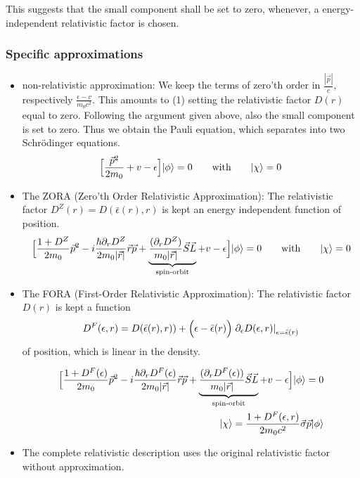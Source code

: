 \documentclass[11pt,a4paper]{report}
\begin{document}
This suggests that the small component shall be set to zero, whenever,
a energy-independent relativistic factor is chosen.  

\subsubsection{Specific approximations}
\begin{itemize}
\item non-relativistic approximation: We keep the terms of zero'th
  order in $\frac{|\vec{p}|}{c}$, respectively
  $\frac{\epsilon-v}{m_0c^2}$. This amounts to (1) setting the
  relativistic factor $D(r)$ equal to zero. Following the argument
  given above, also the small component is set to zero. Thus we
  obtain the Pauli equation, which separates into two Schr\"odinger
  equations.
  \begin{eqnarray}
  \Bigl[ \frac{\vec{p}^2}{2m_0}+v-\epsilon\Bigr]|\phi\rangle=0
\qquad\text{with}\qquad
  |\chi\rangle=0
  \end{eqnarray}
%
\item The ZORA (Zero'th Order Relativistic Approximation): The
  relativistic factor $D^{Z}(r)=D(\bar{\epsilon}(r),r)$ is kept an
  energy independent function of position.
\begin{eqnarray}
\Bigl[
\frac{1+D^Z}{2m_0}\vec{p}^2 
-i\frac{\hbar\partial_rD^Z}{2m_0|\vec{r}|}\vec{r}\vec{p} 
+ \underbrace{\frac{(\partial_r D^Z)}{m_0|\vec{r}|}
\vec{S}\vec{L}}_{\text{spin-orbit}}
+v-\epsilon\Bigr]|\phi\rangle=0
\qquad\text{with}\qquad
  |\chi\rangle=0
\end{eqnarray}
%
\item The FORA (First-Order Relativistic Approximation): The
  relativistic factor $D(r)$ is kept a function 
\begin{eqnarray}
D^{F}(\epsilon,r)=
D(\bar{\epsilon}(r),r))
+\Bigl(\epsilon-\bar{\epsilon}(r)\Bigr)
\left.\partial_\epsilon D(\epsilon,r)\right|_{\epsilon=\bar{\epsilon}(r)}
\end{eqnarray}
of position, which is
  linear in the density.

\begin{eqnarray}
\Bigl[
\frac{1+D^{F}(\epsilon)}{2m_0}\vec{p}^2 
-i\frac{\hbar\partial_rD^{F}(\epsilon)}{2m_0|\vec{r}|}\vec{r}\vec{p} 
+ \underbrace{\frac{(\partial_r D^{F}(\epsilon))}{m_0|\vec{r}|}
\vec{S}\vec{L}}_{\text{spin-orbit}}
+v-
\epsilon
\Bigr]|\phi\rangle=0
\nonumber\\
  |\chi\rangle=\frac{1+D^F(\epsilon,r)}{2m_0c^2}\vec{\sigma}\vec{p}|\phi\rangle
\end{eqnarray}
%
\item The complete relativistic description uses the original
  relativistic factor without approximation.
\end{itemize}
\end{document}
